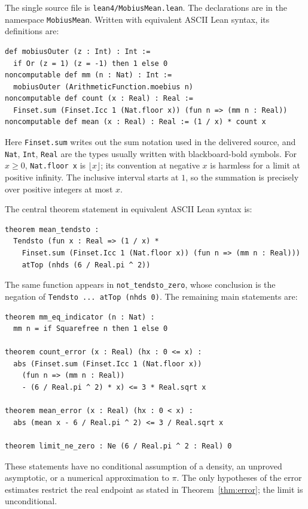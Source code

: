 \documentclass[11pt]{article}
\begin{document}
The single source file is \texttt{lean4/MobiusMean.lean}. The declarations
are in the namespace \texttt{MobiusMean}. Written with equivalent ASCII Lean syntax,
its definitions are:
\begin{lstlisting}
def mobiusOuter (z : Int) : Int :=
  if Or (z = 1) (z = -1) then 1 else 0
noncomputable def mm (n : Nat) : Int :=
  mobiusOuter (ArithmeticFunction.moebius n)
noncomputable def count (x : Real) : Real :=
  Finset.sum (Finset.Icc 1 (Nat.floor x)) (fun n => (mm n : Real))
noncomputable def mean (x : Real) : Real := (1 / x) * count x
\end{lstlisting}
Here \texttt{Finset.sum} writes out the sum notation used in the delivered
source, and \texttt{Nat}, \texttt{Int}, \texttt{Real} are the types
usually written with blackboard-bold symbols.
For $x\geq0$, \texttt{Nat.floor x} is $\lfloor x\rfloor$; its convention
at negative $x$ is harmless for a limit at positive infinity.
The inclusive interval starts at $1$, so the summation is precisely over
positive integers at most $x$.

The central theorem statement in equivalent ASCII Lean syntax is:
\begin{lstlisting}
theorem mean_tendsto :
  Tendsto (fun x : Real => (1 / x) *
    Finset.sum (Finset.Icc 1 (Nat.floor x)) (fun n => (mm n : Real)))
    atTop (nhds (6 / Real.pi ^ 2))
\end{lstlisting}
The same function appears in \texttt{not\_tendsto\_zero}, whose
conclusion is the negation of \texttt{Tendsto ... atTop (nhds 0)}.
The remaining main statements are:
\begin{lstlisting}
theorem mm_eq_indicator (n : Nat) :
  mm n = if Squarefree n then 1 else 0

theorem count_error (x : Real) (hx : 0 <= x) :
  abs (Finset.sum (Finset.Icc 1 (Nat.floor x))
    (fun n => (mm n : Real))
    - (6 / Real.pi ^ 2) * x) <= 3 * Real.sqrt x

theorem mean_error (x : Real) (hx : 0 < x) :
  abs (mean x - 6 / Real.pi ^ 2) <= 3 / Real.sqrt x

theorem limit_ne_zero : Ne (6 / Real.pi ^ 2 : Real) 0
\end{lstlisting}
These statements have no conditional assumption of a density, an
unproved asymptotic, or a numerical approximation to $\pi$.
The only hypotheses of the error estimates restrict the real endpoint
as stated in Theorem~\ref{thm:error}; the limit is unconditional.
\end{document}
